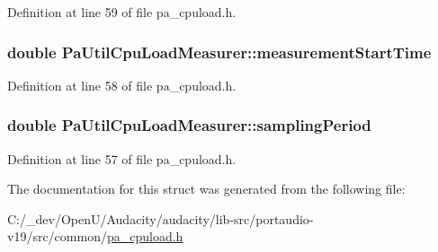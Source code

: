 Definition at line 59 of file pa\+\_\+cpuload.\+h.

\subsubsection[{\texorpdfstring{measurement\+Start\+Time}{measurementStartTime}}]{\setlength{\rightskip}{0pt plus 5cm}double Pa\+Util\+Cpu\+Load\+Measurer\+::measurement\+Start\+Time}\hypertarget{struct_pa_util_cpu_load_measurer_add48e8254754c024b704b06cd0251b23}{}\label{struct_pa_util_cpu_load_measurer_add48e8254754c024b704b06cd0251b23}


Definition at line 58 of file pa\+\_\+cpuload.\+h.

\subsubsection[{\texorpdfstring{sampling\+Period}{samplingPeriod}}]{\setlength{\rightskip}{0pt plus 5cm}double Pa\+Util\+Cpu\+Load\+Measurer\+::sampling\+Period}\hypertarget{struct_pa_util_cpu_load_measurer_a302323c24d72fb4d07c81150121484a0}{}\label{struct_pa_util_cpu_load_measurer_a302323c24d72fb4d07c81150121484a0}


Definition at line 57 of file pa\+\_\+cpuload.\+h.



The documentation for this struct was generated from the following file\+:\begin{DoxyCompactItemize}
\item 
C\+:/\+\_\+dev/\+Open\+U/\+Audacity/audacity/lib-\/src/portaudio-\/v19/src/common/\hyperlink{pa__cpuload_8h}{pa\+\_\+cpuload.\+h}\end{DoxyCompactItemize}
